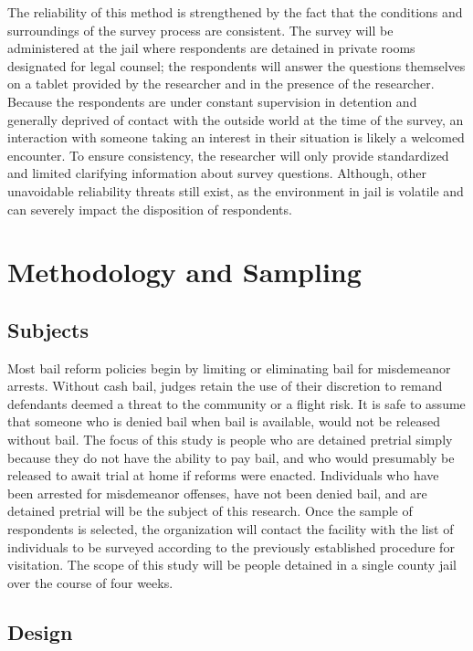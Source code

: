 \documentclass[
  letterpaper,
  DIV=11,
  numbers=noendperiod]{scrartcl}
\begin{document}
The reliability of this method is strengthened by the fact that the
conditions and surroundings of the survey process are consistent. The
survey will be administered at the jail where respondents are detained
in private rooms designated for legal counsel; the respondents will
answer the questions themselves on a tablet provided by the researcher
and in the presence of the researcher. Because the respondents are under
constant supervision in detention and generally deprived of contact with
the outside world at the time of the survey, an interaction with someone
taking an interest in their situation is likely a welcomed encounter. To
ensure consistency, the researcher will only provide standardized and
limited clarifying information about survey questions. Although, other
unavoidable reliability threats still exist, as the environment in jail
is volatile and can severely impact the disposition of respondents.

\hypertarget{methodology-and-sampling}{%
\section{Methodology and Sampling}\label{methodology-and-sampling}}

\hypertarget{subjects}{%
\subsection{Subjects}\label{subjects}}

Most bail reform policies begin by limiting or eliminating bail for
misdemeanor arrests. Without cash bail, judges retain the use of their
discretion to remand defendants deemed a threat to the community or a
flight risk. It is safe to assume that someone who is denied bail when
bail is available, would not be released without bail. The focus of this
study is people who are detained pretrial simply because they do not
have the ability to pay bail, and who would presumably be released to
await trial at home if reforms were enacted. Individuals who have been
arrested for misdemeanor offenses, have not been denied bail, and are
detained pretrial will be the subject of this research. Once the sample
of respondents is selected, the organization will contact the facility
with the list of individuals to be surveyed according to the previously
established procedure for visitation. The scope of this study will be
people detained in a single county jail over the course of four weeks.

\hypertarget{design}{%
\subsection{Design}\label{design}}
\end{document}
